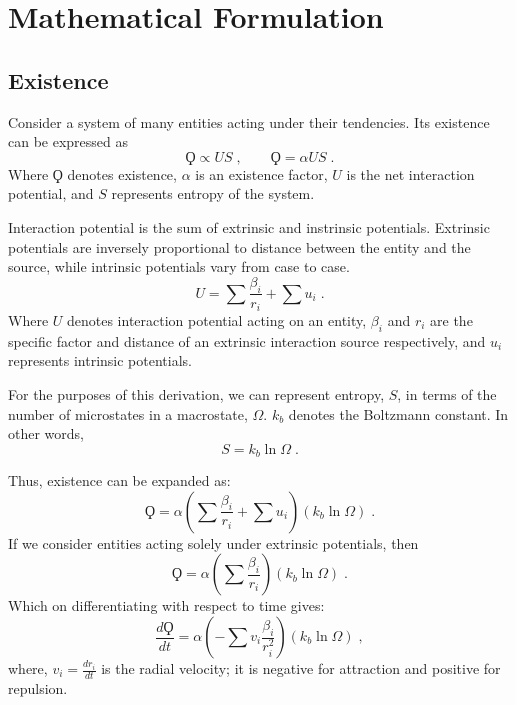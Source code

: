 \documentclass{article}
\begin{document}
\newpage
\section{Mathematical Formulation}


\subsection{Existence}

Consider a system of many entities acting under their tendencies. 
Its existence can be expressed as
\begin{equation*}
    \Koppa \propto US\;,
    \qquad
    \Koppa = \alpha US\;.
\end{equation*}
Where $\Koppa$ denotes existence, $\alpha$ is an existence factor, $U$ is the net interaction potential, and $S$ represents entropy of the system.

Interaction potential is the sum of extrinsic and instrinsic potentials.
Extrinsic potentials are inversely proportional to distance between the entity and the source, while intrinsic potentials vary from case to case.
\begin{equation*}
    U = \sum \frac{\beta_{i}}{r_{i}} + \sum u_{i}\;.
\end{equation*}
Where $U$ denotes interaction potential acting on an entity, $\beta_{i}$ and $r_{i}$ are the specific factor and distance of an extrinsic interaction source respectively, and $u_{i}$ represents intrinsic potentials.

For the purposes of this derivation, we can represent entropy, $S$, in terms of the number of microstates in a macrostate, $\Omega$. $k_{b}$ denotes the Boltzmann constant. 
In other words,
\begin{equation*}
    S = k_{b} \ln \Omega\;.
\end{equation*}

Thus, existence can be expanded as:
\begin{equation*}
    \Koppa = \alpha \left( \sum \frac{\beta_{i}}{r_{i}} + \sum u_{i} \right) \left( k_{b} \ln \Omega \right)\;.
\end{equation*}
If we consider entities acting solely under extrinsic potentials, then 
\begin{equation*}
    \Koppa = \alpha \left( \sum \frac{\beta_{i}}{r_{i}} \right) \left( k_{b} \ln \Omega \right)\;.
\end{equation*}
Which on differentiating with respect to time gives:
\begin{equation*}
    \frac{d\Koppa}{dt} = \alpha \left( -\sum v_{i}\frac{\beta_{i}}{r^2_{i}} \right) \left( k_{b} \ln \Omega \right)\;,
\end{equation*}
where, $v_i = \frac{dr_i}{dt}$ is the radial velocity; it is negative for attraction and positive for repulsion.
\end{document}
